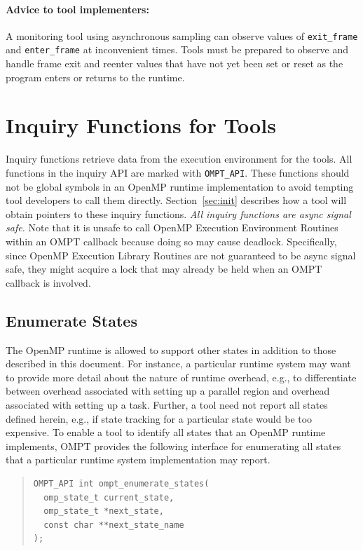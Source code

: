 \documentclass{article}
\begin{document}
\paragraph{Advice to tool implementers:} A monitoring tool using
      asynchronous sampling can observe values of 
      \verb|exit_frame| and \verb|enter_frame| at inconvenient times. 
      Tools must be prepared to observe and handle frame exit and reenter values that have not yet been set or reset as the program enters or returns to the runtime. 

\section{Inquiry Functions for Tools}
\label{sec:inquiry}

 Inquiry functions retrieve data from the execution environment for
 the tools. 
 All functions in the inquiry API are marked with \verb|OMPT_API|. These functions should not be global symbols in an OpenMP runtime implementation to avoid tempting tool developers to call them directly. Section~\ref{sec:init} describes how a tool will obtain pointers to these inquiry functions.
 {\em All inquiry functions are async signal safe.} 
 Note that it is unsafe to call OpenMP Execution Environment Routines within an OMPT callback because doing so may cause deadlock. 
 Specifically, since OpenMP Execution Library Routines are not guaranteed to be async signal safe, they might acquire a lock that may already be held when an OMPT callback is involved.
 
 \subsection{Enumerate States}
 \label{ompt_enumerate_states}
 
 The OpenMP runtime is allowed to support other states in addition to those described in this document.
For instance, a particular runtime system may want to 
provide more detail about the nature of runtime overhead, 
e.g., to differentiate between  overhead associated with setting up a parallel region
and  overhead associated with setting up a task. Further, a tool need not report all states defined herein, e.g., if state tracking for a particular state would be too expensive.
To enable a tool to identify all states that an OpenMP runtime implements, OMPT provides
the following interface for enumerating all states that a particular runtime system implementation may report.

\begin{quote}
\begin{verbatim}
OMPT_API int ompt_enumerate_states(
  omp_state_t current_state, 
  omp_state_t *next_state, 
  const char **next_state_name
);
\end{verbatim}
\end{quote}
\end{document}
